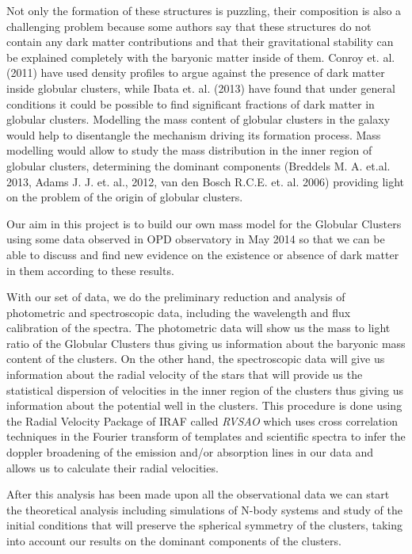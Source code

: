 Not only the formation of these structures is puzzling, their composition is also a challenging problem because some authors say that these structures do not contain any dark matter contributions and that their gravitational stability can be explained completely with the baryonic matter inside of them. Conroy et. al. (2011) have used density profiles to argue against the presence of dark matter inside globular clusters, while Ibata et. al. (2013) have found that under general conditions it could be possible to find significant fractions of dark matter in globular clusters. Modelling the mass content of globular clusters in the galaxy would help to disentangle the mechanism driving its formation process. Mass modelling would allow to study the mass distribution in the inner region of globular clusters, determining the dominant components (Breddels M. A. et.al. 2013, Adams J. J. et. al., 2012, van den Bosch R.C.E. et. al. 2006) providing light on the problem of the origin of globular clusters.

Our aim in this project is to build our own mass model for the Globular Clusters using some data observed in OPD observatory in May 2014 so that we can be able to discuss and find new evidence on the existence or absence of dark matter in them according to these results. 

With our set of data, we do the preliminary reduction and analysis of photometric and spectroscopic data, including the wavelength and flux calibration of the spectra. The photometric data will show us the mass to light ratio of the Globular Clusters thus giving us information about the baryonic mass content of the clusters. On the other hand, the spectroscopic data will give us information about the radial velocity of the stars that will provide us the statistical dispersion of velocities in the inner region of the clusters thus giving us information about the potential well in the clusters. This procedure is done using the Radial Velocity Package of IRAF called \textit{RVSAO} which uses cross correlation techniques in the Fourier transform of templates and scientific spectra to infer the doppler broadening of the emission and/or absorption lines in our data and allows us to calculate their radial velocities. 

After this analysis has been made upon all the observational data we can start the theoretical analysis including simulations of N-body systems and study of the initial conditions that will preserve the spherical symmetry of the clusters, taking into account our results on the dominant components of the clusters. 

